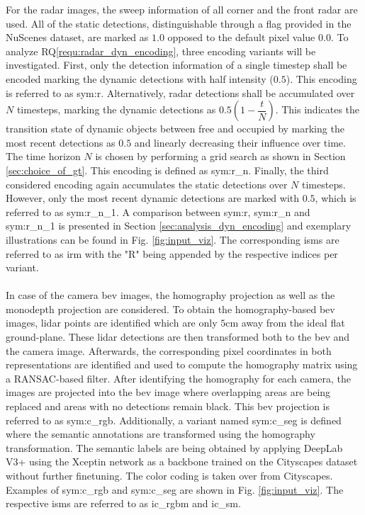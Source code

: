 For the radar images, the sweep information of all corner and the front radar are used. All of the static detections, distinguishable through a flag provided in the NuScenes dataset, are marked as $1.0$ opposed to the default pixel value $0.0$. To analyze RQ\ref{requ:radar_dyn_encoding}, three encoding variants will be investigated. First, only the detection information of a single timestep shall be encoded marking the dynamic detections with half intensity ($0.5$). This encoding is referred to as \gls{sym:r}. Alternatively, radar detections shall be accumulated over $N$ timesteps, marking the dynamic detections as $0.5(1-\dfrac{t}{N})$. This indicates the transition state of dynamic objects between free and occupied by marking the most recent detections as $0.5$ and linearly decreasing their influence over time. The time horizon $N$ is chosen by performing a grid search as shown in Section \ref{sec:choice_of_gt}. This encoding is defined as \gls{sym:r_n}. Finally, the third considered encoding again accumulates the static detections over $N$ timesteps. However, only the most recent dynamic detections are marked with $0.5$, which is referred to as \gls{sym:r_n_1}. A comparison between \gls{sym:r}, \gls{sym:r_n} and \gls{sym:r_n_1} is presented in Section \ref{sec:analysis_dyn_encoding} and exemplary illustrations can be found in Fig. \ref{fig:input_viz}. The corresponding \gls{ism}s are referred to as \gls{irm} with the "R" being appended by the respective indices per variant.
\\\\
In case of the camera \gls{bev} images, the homography projection as well as the \gls{monodepth} projection are considered. To obtain the homography-based \gls{bev} images, lidar points are identified which are only $5$cm away from the ideal flat ground-plane. These lidar detections are then transformed both to the \gls{bev} and the camera image. Afterwards, the corresponding pixel coordinates in both representations are identified and used to compute the homography matrix using a RANSAC-based filter. After identifying the homography for each camera, the images are projected into the \gls{bev} image where overlapping areas are being replaced and areas with no detections remain black. This \gls{bev} projection is referred to as \gls{sym:c_rgb}. Additionally, a variant named \gls{sym:c_seg} is defined where the semantic annotations are transformed using the homography transformation. The semantic labels are being obtained by applying DeepLab V3+ \cite{deeplabv3plus2018} using the Xceptin network \cite{chollet2017xception} as a backbone trained on the Cityscapes dataset \cite{cordts2016cityscapes} without further finetuning. The color coding is taken over from Cityscapes. Examples of \gls{sym:c_rgb} and \gls{sym:c_seg} are shown in Fig. \ref{fig:input_viz}. The respective \gls{ism}s are referred to as \gls{ic_rgbm} and \gls{ic_sm}.

